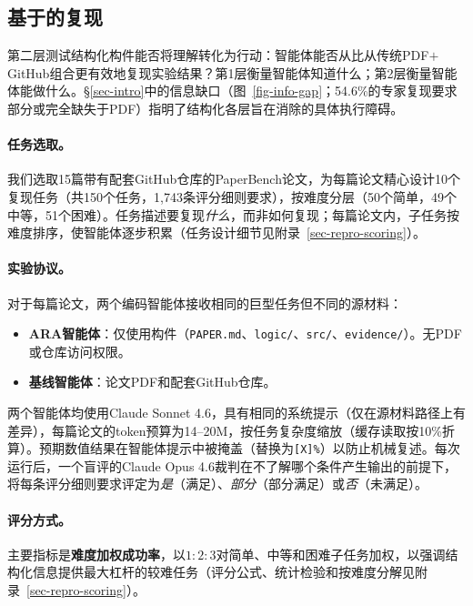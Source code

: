 \subsection{基于\ara{}的复现}
\label{sec-eval-reproduction}
\label{sec-eval-repro-cost}\label{sec-eval-t3-ext}

第二层测试结构化构件能否将理解转化为行动：智能体能否从\ara{}比从传统PDF$+$GitHub组合更有效地复现实验结果？第1层衡量智能体知道什么；第2层衡量智能体能做什么。\S\ref{sec-intro}中的信息缺口（图~\ref{fig-info-gap}；54.6\%的专家复现要求部分或完全缺失于PDF）指明了\ara{}结构化各层旨在消除的具体执行障碍。

\paragraph{任务选取。}
我们选取15篇带有配套GitHub仓库的PaperBench论文，为每篇论文精心设计10个复现任务（共150个任务，1{,}743条评分细则要求），按难度分层（50个简单，49个中等，51个困难）。任务描述要复现\emph{什么}，而非如何复现；每篇论文内，子任务按难度排序，使智能体逐步积累（任务设计细节见附录~\ref{sec-repro-scoring}）。

\paragraph{实验协议。}
对于每篇论文，两个编码智能体接收相同的巨型任务但不同的源材料：
\begin{itemize}[leftmargin=*, itemsep=1pt, topsep=2pt]
  \item \textbf{ARA智能体}：仅使用\ara{}构件（\texttt{PAPER.md}、\texttt{logic/}、\texttt{src/}、\texttt{evidence/}）。无PDF或仓库访问权限。
  \item \textbf{基线智能体}：论文PDF和配套GitHub仓库。
\end{itemize}
两个智能体均使用Claude Sonnet 4.6，具有相同的系统提示（仅在源材料路径上有差异），每篇论文的token预算为14--20M，按任务复杂度缩放（缓存读取按10\%折算）。预期数值结果在智能体提示中被掩盖（替换为\texttt{[X]\%}）以防止机械复述。每次运行后，一个盲评的Claude Opus 4.6裁判在不了解哪个条件产生输出的前提下，将每条评分细则要求评定为\emph{是}（满足）、\emph{部分}（部分满足）或\emph{否}（未满足）。

\paragraph{评分方式。}
主要指标是\textbf{难度加权成功率}，以$1\!:\!2\!:\!3$对简单、中等和困难子任务加权，以强调结构化信息提供最大杠杆的较难任务（评分公式、统计检验和按难度分解见附录~\ref{sec-repro-scoring}）。

